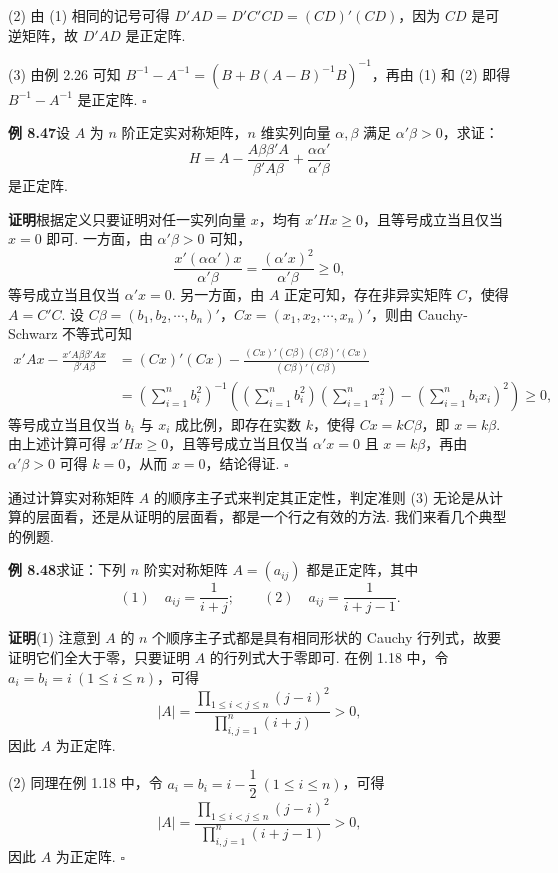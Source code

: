 \documentclass[UTF8, 12pt, fontset=fandol, oneside]{ctexart}
\begin{document}
(2) 由 (1) 相同的记号可得 $D'AD=D'C'CD=(CD)'(CD)$，因为 $CD$ 是可逆矩阵，故 $D'AD$ 是正定阵.

(3) 由例 2.26 可知 $B^{-1}-A^{-1}=(B+B(A-B)^{-1}B)^{-1}$，再由 (1) 和 (2) 即得 $B^{-1}-A^{-1}$ 是正定阵. $\ensuremath{\square}$

\noindent\textbf{例 8.47}\quad 设 $A$ 为 $n$ 阶正定实对称矩阵，$n$ 维实列向量 $\alpha,\beta$ 满足 $\alpha'\beta>0$，求证：
\[
H=A-\frac{A\beta\beta'A}{\beta'A\beta}+\frac{\alpha\alpha'}{\alpha'\beta}
\]
是正定阵.

\noindent\textbf{证明}\quad 根据定义只要证明对任一实列向量 $x$，均有 $x'Hx\ge 0$，且等号成立当且仅当 $x=0$ 即可. 一方面，由 $\alpha'\beta>0$ 可知，
\[
\frac{x'(\alpha\alpha')x}{\alpha'\beta}=\frac{(\alpha'x)^2}{\alpha'\beta}\ge 0,
\]
等号成立当且仅当 $\alpha'x=0$. 另一方面，由 $A$ 正定可知，存在非异实矩阵 $C$，使得 $A=C'C$. 设 $C\beta=(b_1,b_2,\cdots,b_n)'$，$Cx=(x_1,x_2,\cdots,x_n)'$，则由 Cauchy-Schwarz 不等式可知
\[
\begin{aligned}
x'Ax-\frac{x'A\beta\beta'Ax}{\beta'A\beta}
&=(Cx)'(Cx)-\frac{(Cx)'(C\beta)(C\beta)'(Cx)}{(C\beta)'(C\beta)}\\
&=\left(\sum_{i=1}^n b_i^2\right)^{-1}
\left(\left(\sum_{i=1}^n b_i^2\right)\left(\sum_{i=1}^n x_i^2\right)-\left(\sum_{i=1}^n b_ix_i\right)^2\right)\ge 0,
\end{aligned}
\]
等号成立当且仅当 $b_i$ 与 $x_i$ 成比例，即存在实数 $k$，使得 $Cx=kC\beta$，即 $x=k\beta$. 由上述计算可得 $x'Hx\ge 0$，且等号成立当且仅当 $\alpha'x=0$ 且 $x=k\beta$，再由 $\alpha'\beta>0$ 可得 $k=0$，从而 $x=0$，结论得证. $\ensuremath{\square}$

通过计算实对称矩阵 $A$ 的顺序主子式来判定其正定性，判定准则 (3) 无论是从计算的层面看，还是从证明的层面看，都是一个行之有效的方法. 我们来看几个典型的例题.

\noindent\textbf{例 8.48}\quad 求证：下列 $n$ 阶实对称矩阵 $A=(a_{ij})$ 都是正定阵，其中
\[
(1)\quad a_{ij}=\frac1{i+j};\qquad
(2)\quad a_{ij}=\frac1{i+j-1}.
\]

\noindent\textbf{证明}\quad (1) 注意到 $A$ 的 $n$ 个顺序主子式都是具有相同形状的 Cauchy 行列式，故要证明它们全大于零，只要证明 $A$ 的行列式大于零即可. 在例 1.18 中，令 $a_i=b_i=i\ (1\le i\le n)$，可得
\[
|A|=\frac{\prod_{1\le i<j\le n}(j-i)^2}{\prod_{i,j=1}^n(i+j)}>0,
\]
因此 $A$ 为正定阵.

(2) 同理在例 1.18 中，令 $a_i=b_i=i-\dfrac12\ (1\le i\le n)$，可得
\[
|A|=\frac{\prod_{1\le i<j\le n}(j-i)^2}{\prod_{i,j=1}^n(i+j-1)}>0,
\]
因此 $A$ 为正定阵. $\ensuremath{\square}$
\end{document}
